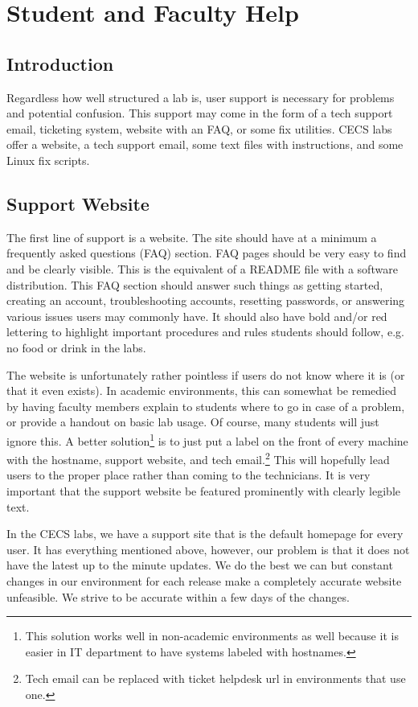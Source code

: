 \section{Student and Faculty Help}\label{sec:student_faculty_help}
\subsection{Introduction}
Regardless how well structured a lab is, user support is necessary for problems and potential confusion.  This support may come in the form of a tech support email, ticketing system, website with an FAQ, or some fix utilities.  CECS labs offer a website, a tech support email, some text files with instructions, and some Linux fix scripts.
\subsection{Support Website}
The first line of support is a website.  The site should have at a minimum a frequently asked questions (FAQ) section.  FAQ pages should be very easy to find and be clearly visible.  This is the equivalent of a README file with a software distribution.  This FAQ section should answer such things as getting started, creating an account, troubleshooting accounts, resetting passwords, or answering various issues users may commonly have.  It should also have bold and/or red lettering to highlight important procedures and rules students should follow, e.g. no food or drink in the labs. 

The website is unfortunately rather pointless if users do not know where it is (or that it even exists).  In academic environments, this can somewhat be remedied by having faculty members explain to students where to go in case of a problem, or provide a handout on basic lab usage.  Of course, many students will just ignore this.  A better solution\footnote{This solution works well in non-academic environments as well because it is easier in IT department to have systems labeled with hostnames.} is to just put a label on the front of every machine with the hostname, support website, and tech email.\footnote{Tech email can be replaced with ticket helpdesk url in environments that use one.}  This will hopefully lead users to the proper place rather than coming to the technicians.  It is very important that the support website be featured prominently with clearly legible text. 

In the CECS labs, we have a support site that is the default homepage for every user.  It has everything mentioned above, however, our problem is that it does not have the latest up to the minute updates.  We do the best we can but constant changes in our environment for each release make a completely accurate website unfeasible. We strive to be accurate within a few days of the changes.

